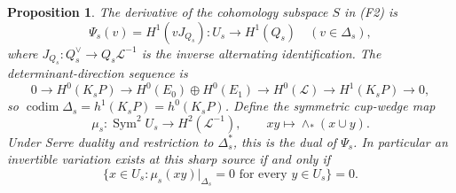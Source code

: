 \documentclass[11pt]{article}
\newtheorem{proposition}[theorem]{Proposition}
\theoremstyle{definition}\newtheorem{definition}[theorem]{Definition}
\theoremstyle{remark}\newtheorem{remark}[theorem]{Remark}
\begin{document}
\begin{proposition}\label{prop:restricted}
The derivative of the cohomology subspace $S$ in (F2) is
\[
 \Psi_s(v)=H^1(vJ_{Q_s}):U_s\longrightarrow H^1(Q_s)
       \quad(v\in\Delta_s),                               \tag{P1}
\]
where $J_{Q_s}:Q_s^\vee\to Q_s\mathcal L^{-1}$ is the inverse alternating identification. The determinant-direction sequence is
\[
 0\to H^0(K_sP)\to H^0(E_0)\oplus H^0(E_1)\to
 H^0(\mathcal L)\to H^1(K_sP)\to0,                          \tag{P2}
\]
so $\operatorname{codim}\Delta_s=h^1(K_sP)=h^0(K_sP)$.
Define the symmetric cup-wedge map
\[
 \mu_s:\operatorname{Sym}^2U_s\longrightarrow H^2(\mathcal L^{-1}),
 \qquad xy\longmapsto\wedge_*(x\cup y).
\]
Under Serre duality and restriction to $\Delta_s^*$, this is the dual of $\Psi_s$. In particular an invertible variation exists at this sharp source if and only if
\[
 \{x\in U_s:\mu_s(xy)|_{\Delta_s}=0\text{ for every }y\in U_s\}=0.
                                                                    \tag{P3}
\]
\end{proposition}
\end{document}
